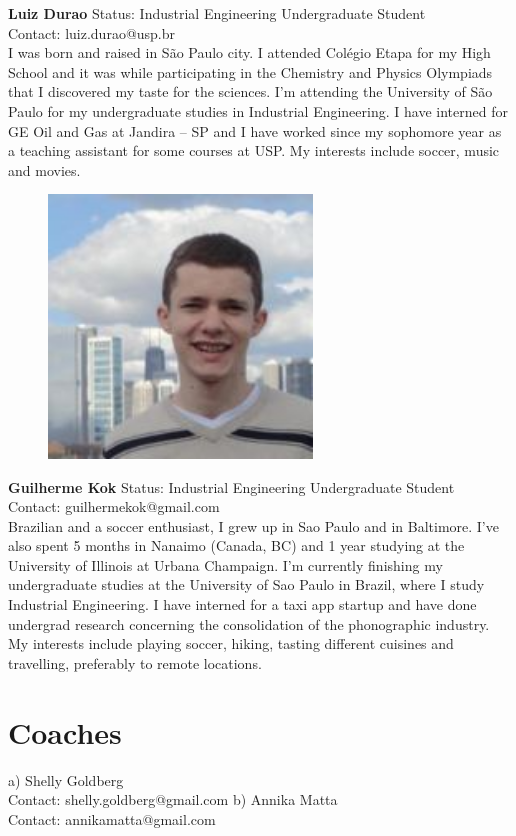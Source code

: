 \documentclass[a4paper, 12pt,conference]{new_cit_thesis}
\begin{document}
\textbf{Luiz Durao}
Status: Industrial Engineering Undergraduate Student \\
Contact: luiz.durao@usp.br \\
I was born and raised in São Paulo city. I attended Colégio Etapa for my High School and it was while participating in the Chemistry and Physics Olympiads that I discovered my taste for the sciences. I’m attending the University of São Paulo for my undergraduate studies in Industrial Engineering. I have interned for GE Oil and Gas at Jandira – SP and I have worked since my sophomore year as a teaching assistant for some courses at USP. My interests include soccer, music and movies.

\begin{figure}[h]
  \centering
     \includegraphics[width=7cm]{images/image016}
  \label{fig:16}
\end{figure}

\textbf{Guilherme Kok}
Status: Industrial Engineering Undergraduate Student \\
Contact: guilhermekok@gmail.com \\
Brazilian and a soccer enthusiast, I grew up in Sao Paulo and in Baltimore. I’ve also spent 5 months in Nanaimo (Canada, BC) and 1 year studying at the University of Illinois at Urbana Champaign. I’m currently finishing my undergraduate studies at the University of Sao Paulo in Brazil, where I study Industrial Engineering. I have interned for a taxi app startup and have done undergrad research concerning the consolidation of the phonographic industry. My interests include playing soccer, hiking, tasting different cuisines and travelling, preferably to remote locations. 

\section{Coaches}
a) Shelly Goldberg \\
Contact: shelly.goldberg@gmail.com
b) Annika Matta \\
Contact: annikamatta@gmail.com
\end{document}
